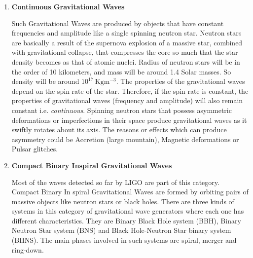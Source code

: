 \begin{enumerate}

\item \textbf{Continuous Gravitational Waves} 
    
\noindent Such Gravitational Waves are produced by objects that have constant frequencies and amplitude like a single spinning neutron star. Neutron stars are basically a result of the supernova explosion of a massive star, combined with gravitational collapse, that compresses the core so much that the star density becomes as that of atomic nuclei. Radius of neutron stars will be in the order of 10 kilometers, and mass will be around 1.4 Solar masses. So density will be around $10^{17}\: \text{Kg}\text{m}^{-3}$. The properties of the gravitational waves depend on the spin rate of the star. Therefore, if the spin rate is constant, the properties of gravitational waves (frequency and amplitude) will also remain constant i.e. \textit{continuous}. Spinning neutron stars that possess asymmetric deformations or imperfections in their space produce gravitational waves as it swiftly rotates about its axis. The reasons or effects which can produce asymmetry could be Accretion (large mountain), Magnetic deformations or Pulsar glitches.

\vspace{0.2cm}

\item \textbf{Compact Binary Inspiral Gravitational Waves}
    
\noindent Most of the waves detected so far by LIGO are part of this category. Compact Binary In spiral Gravitational Waves are formed by orbiting pairs of massive objects like neutron stars or black holes. There are three kinds of systems in this category of gravitational wave generators where each one has different characteristics. They are Binary Black Hole system (BBH), Binary Neutron Star system (BNS) and Black Hole-Neutron Star binary system (BHNS). The main phases involved in such systems are spiral, merger and ring-down.


\end{enumerate}
